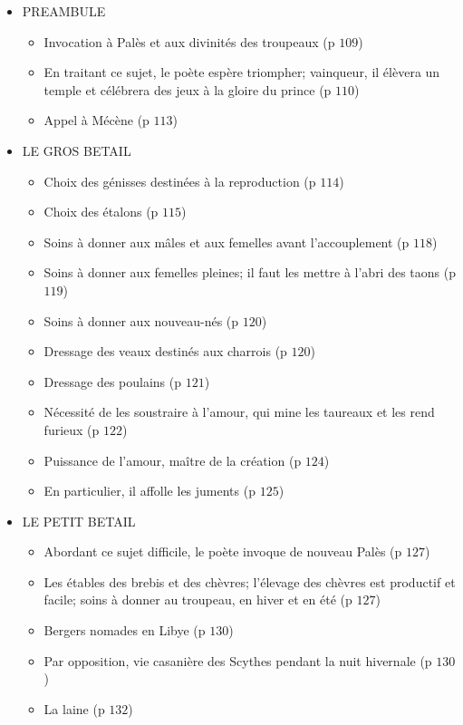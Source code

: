 \documentclass[a4paper, 11pt, hidelinks]{article}
\begin{document}
\begin{itemize}
    \item PREAMBULE \begin{itemize}
        \item Invocation à Palès et aux divinités des troupeaux (p $109$)
        \item En traitant ce sujet, le poète espère triompher; vainqueur, il élèvera un temple et célébrera des jeux à la gloire du prince (p $110$)
        \item Appel à Mécène (p $113$)
    \end{itemize}
    \item LE GROS BETAIL \begin{itemize} 
        \item Choix des génisses destinées à la reproduction (p $114$)
        \item Choix des étalons (p $115$)
        \item Soins à donner aux mâles et aux femelles avant l'accouplement (p $118$)
        \item Soins à donner aux femelles pleines; il faut les mettre à l'abri des taons (p $119$)
        \item Soins à donner aux nouveau-nés (p $120$)
        \item Dressage des veaux destinés aux charrois (p $120$)
        \item Dressage des poulains (p $121$)
        \item Nécessité de les soustraire à l'amour, qui mine les taureaux et les rend furieux (p $122$)
        \item Puissance de l'amour, maître de la création (p $124$)
        \item En particulier, il affolle les juments (p $125$)
    \end{itemize}
    \item LE PETIT BETAIL \begin{itemize} 
        \item Abordant ce sujet difficile, le poète invoque de nouveau Palès (p $127$)
        \item Les étables des brebis et des chèvres; l'élevage des chèvres est productif et facile; soins à donner au troupeau, en hiver et en été  (p $127$)
        \item Bergers nomades en Libye (p $130$)
        \item Par opposition, vie casanière des Scythes pendant la nuit hivernale (p $130$)
        \item La laine (p $132$)

\end{itemize}
\end{itemize}
\end{document}
